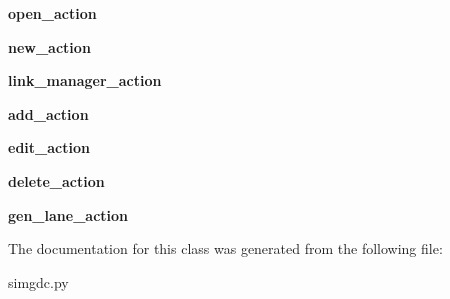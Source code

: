 \begin{DoxyCompactItemize}
\item 
\hypertarget{class_sim_g_d_c_1_1simgdc_1_1_sim_g_d_c_a5373c408da7d6032b6fb34862c717a7e}{}{\bfseries open\+\_\+action}\label{class_sim_g_d_c_1_1simgdc_1_1_sim_g_d_c_a5373c408da7d6032b6fb34862c717a7e}

\item 
\hypertarget{class_sim_g_d_c_1_1simgdc_1_1_sim_g_d_c_af41cb607ef8832224eaf61a520d64206}{}{\bfseries new\+\_\+action}\label{class_sim_g_d_c_1_1simgdc_1_1_sim_g_d_c_af41cb607ef8832224eaf61a520d64206}

\item 
\hypertarget{class_sim_g_d_c_1_1simgdc_1_1_sim_g_d_c_a38e5cc7f00b8e270daf1211820c993bc}{}{\bfseries link\+\_\+manager\+\_\+action}\label{class_sim_g_d_c_1_1simgdc_1_1_sim_g_d_c_a38e5cc7f00b8e270daf1211820c993bc}

\item 
\hypertarget{class_sim_g_d_c_1_1simgdc_1_1_sim_g_d_c_adad5b1a03b9997e09532c4a4f6c08409}{}{\bfseries add\+\_\+action}\label{class_sim_g_d_c_1_1simgdc_1_1_sim_g_d_c_adad5b1a03b9997e09532c4a4f6c08409}

\item 
\hypertarget{class_sim_g_d_c_1_1simgdc_1_1_sim_g_d_c_a926fe6f8cd21557369c6a178c604a47f}{}{\bfseries edit\+\_\+action}\label{class_sim_g_d_c_1_1simgdc_1_1_sim_g_d_c_a926fe6f8cd21557369c6a178c604a47f}

\item 
\hypertarget{class_sim_g_d_c_1_1simgdc_1_1_sim_g_d_c_ac6b8868f7287a705fa3a55345b52e5e9}{}{\bfseries delete\+\_\+action}\label{class_sim_g_d_c_1_1simgdc_1_1_sim_g_d_c_ac6b8868f7287a705fa3a55345b52e5e9}

\item 
\hypertarget{class_sim_g_d_c_1_1simgdc_1_1_sim_g_d_c_a0a5b2b92bd1d430e0905818ce60817a5}{}{\bfseries gen\+\_\+lane\+\_\+action}\label{class_sim_g_d_c_1_1simgdc_1_1_sim_g_d_c_a0a5b2b92bd1d430e0905818ce60817a5}

\end{DoxyCompactItemize}


The documentation for this class was generated from the following file\+:\begin{DoxyCompactItemize}
\item 
simgdc.\+py\end{DoxyCompactItemize}
